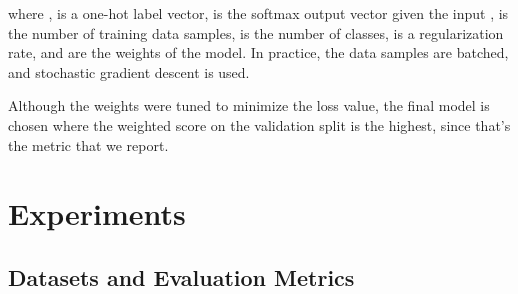 \documentclass[11pt]{article}
\begin{document}
where  , is a one-hot label vector,  is the softmax output vector given the input ,  is the number of training data samples,  is the number of classes,  is a  regularization rate, and  are the weights of the model. In practice, the data samples are batched, and stochastic gradient descent is used.

Although the weights  were tuned to minimize the loss value, the final model is chosen where the weighted  score on the validation split is the highest, since that's the metric that we report.

\section{Experiments}
\label{sec:experiments}

\subsection{Datasets and Evaluation Metrics}

\begin{table}[h]
\centering
{}
\caption{The upper half of the table shows the number of dialogues and utterances of the datasets.\protect\footnotemark. The bottom half shows the mean and the standard deviation of the number of utterances per dialogue. As shown, IEMOCAP has about 5 times more utterances per dialogue than MELD.}
\label{tab:datasets}
\end{table}
\end{document}
